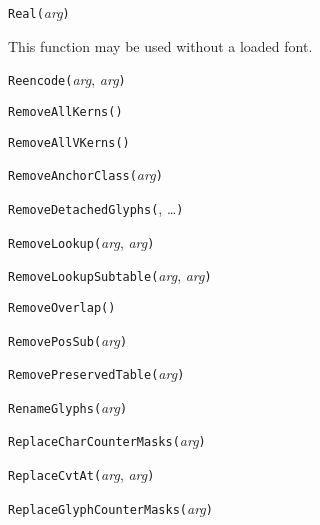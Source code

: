 
\noindent\texttt{Real(}\textit{arg}\texttt{)}

This function may be used without a loaded font.


\noindent\texttt{Reencode(}\textit{arg}, \textit{arg}\texttt{)}


\noindent\texttt{RemoveAllKerns(}\texttt{)}


\noindent\texttt{RemoveAllVKerns(}\texttt{)}


\noindent\texttt{RemoveAnchorClass(}\textit{arg}\texttt{)}


\noindent\texttt{RemoveDetachedGlyphs(}, \ldots\texttt{)}


\noindent\texttt{RemoveLookup(}\textit{arg}, \textit{arg}\texttt{)}


\noindent\texttt{RemoveLookupSubtable(}\textit{arg}, \textit{arg}\texttt{)}


\noindent\texttt{RemoveOverlap(}\texttt{)}


\noindent\texttt{RemovePosSub(}\textit{arg}\texttt{)}


\noindent\texttt{RemovePreservedTable(}\textit{arg}\texttt{)}


\noindent\texttt{RenameGlyphs(}\textit{arg}\texttt{)}


\noindent\texttt{ReplaceCharCounterMasks(}\textit{arg}\texttt{)}


\noindent\texttt{ReplaceCvtAt(}\textit{arg}, \textit{arg}\texttt{)}


\noindent\texttt{ReplaceGlyphCounterMasks(}\textit{arg}\texttt{)}

